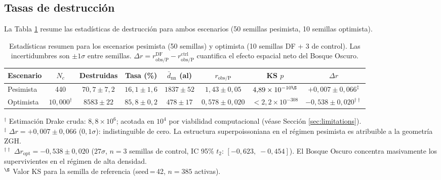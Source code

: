 \documentclass[11pt,a4paper,onecolumn]{article}
\begin{document}
\subsection{Tasas de destrucción}
\label{sec:destruction}

La Tabla \ref{tab:results} resume las estadísticas de destrucción para
ambos escenarios (50 semillas pesimista, 10 semillas optimista).

\begin{table}
  \centering
  \caption{Estadísticas resumen para los escenarios pesimista
           (50 semillas) y optimista (10 semillas DF + 3 de control).
           Las incertidumbres son $\pm 1\sigma$ entre semillas.
           $\Delta r = r_\text{obs/P}^\text{DF} - r_\text{obs/P}^\text{ctrl}$
           cuantifica el efecto espacial neto del Bosque Oscuro.}
  \label{tab:results}
  \begin{tabular}{lccccccc}
    \toprule
    Escenario & $N_c$ & Destruidas & Tasa (\%) &
    $\bar{d}_\text{nn}$ (al) & $r_\text{obs/P}$ & KS $p$ & $\Delta r$ \\
    \midrule
    Pesimista & 440 & $70{,}7 \pm 7{,}2$ & $16{,}1 \pm 1{,}6$ &
    $1837 \pm 52$ & $1{,}43 \pm 0{,}05$ & $4{,}89\times10^{-10\S}$ &
    $+0{,}007 \pm 0{,}066^\ddagger$ \\
    Optimista  & $10{,}000^\dagger$ & $8583 \pm 22$ & $85{,}8 \pm 0{,}2$ &
    $478 \pm 17$  & $0{,}578 \pm 0{,}020$ & $<2{,}2\times10^{-308}$ &
    $-0{,}538 \pm 0{,}020^{\dagger\dagger}$ \\
    \bottomrule
  \end{tabular}
  \begin{flushleft}
    \footnotesize
    $^\dagger$ Estimación Drake cruda: $8{,}8\times10^6$; acotada en $10^4$
    por viabilidad computacional (véase Sección \ref{sec:limitations}).\\
    $^\ddagger$ $\Delta r = +0{,}007 \pm 0{,}066$ ($0{,}1\sigma$):
    indistinguible de cero. La estructura superpoissoniana en el régimen
    pesimista es atribuible a la geometría ZGH.\\
    $^{\dagger\dagger}$ $\Delta r_\text{opt} = -0{,}538 \pm 0{,}020$
    ($27\sigma$, $n = 3$ semillas de control, IC 95\% $t_2$:
    $[-0{,}623,\; -0{,}454]$). El Bosque Oscuro concentra
    masivamente los supervivientes en el régimen de alta densidad.\\
    $^\S$ Valor KS para la semilla de referencia (seed\,=\,42, $n = 385$
    activas).
  \end{flushleft}
\end{table}
\end{document}
